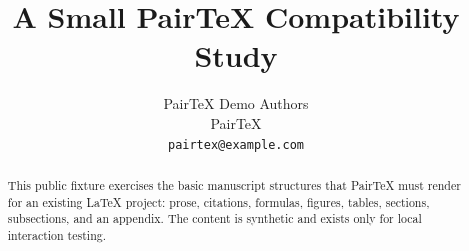 \documentclass{article}
\title{A Small PairTeX Compatibility Study}
\author{PairTeX Demo Authors\\ PairTeX\\ \texttt{pairtex@example.com}}
\begin{document}
\maketitle
\begin{abstract}
This public fixture exercises the basic manuscript structures that PairTeX
must render for an existing LaTeX project: prose, citations, formulas,
figures, tables, sections, subsections, and an appendix. The content is
synthetic and exists only for local interaction testing.
\end{abstract}







\appendix

\end{document}
